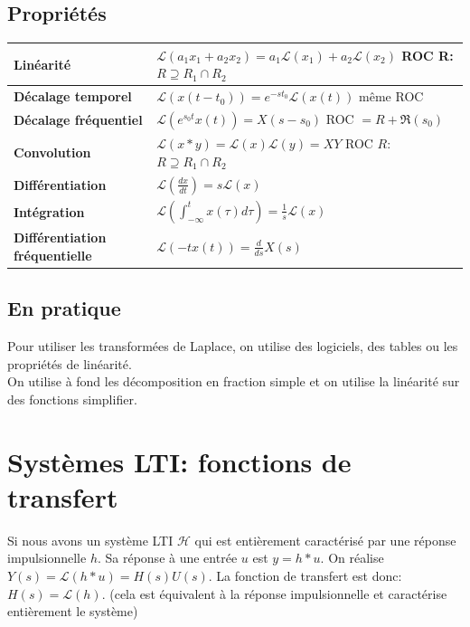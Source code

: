 \documentclass{report}
\begin{document}
\subsection{Propriétés}

\begin{center}
\begin{tabular}{|m{2.5cm}|m{7cm}|}
\hline
\textbf{Linéarité} & $\mathcal{L}(a_1 x_1 + a_2 x_2) = a_1 \mathcal{L}(x_1) + a_2 \mathcal{L}(x_2)$ \newline  ROC R: $R \supseteq R_1 \cap R_2$ \\
\hline
\textbf{Décalage temporel} & $\mathcal{L}(x(t-t_0)) = e^{-s t_0} \mathcal{L}(x(t))$ \newline même ROC\\
\hline
\textbf{Décalage fréquentiel} & $\mathcal{L}(e^{s_0 t}x(t)) = X(s-s_0)$ \newline ROC $= R + \mathfrak{R}(s_0)$\\
\hline
\textbf{Convolution} & $\mathcal{L}(x \ast y) = \mathcal{L}(x) \mathcal{L}(y) = XY$ \newline ROC $R$: $R \supseteq R_1 \cap R_2$\\
\hline
\textbf{Différentiation} & $\mathcal{L} \left( \frac{dx}{dt} \right) = s \mathcal{L}(x)$\\
\hline
\textbf{Intégration} & $\mathcal{L} \left( \int_{-\infty}^t x( \tau ) d \tau \right) = \frac{1}{s} \mathcal{L}(x)$\\
\hline
\textbf{Différentiation fréquentielle} & $\mathcal{L}(-tx(t)) = \frac{d}{ds} X(s)$\\
\hline
\end{tabular}
\end{center}
\subsection{En pratique}
Pour utiliser les transformées de Laplace, on utilise des logiciels, des tables ou les propriétés de linéarité.\\
On utilise à fond les décomposition en fraction simple et on utilise la linéarité sur des fonctions simplifier.

\section{Systèmes LTI: fonctions de transfert}
Si nous avons un système LTI $\mathcal{H}$ qui est entièrement caractérisé par une réponse impulsionnelle $h$. Sa réponse à une entrée $u$ est $y = h \ast u$. On réalise $Y(s) = \mathcal{L}(h \ast u) = H(s) U(s)$. La fonction de transfert est donc: \textbf{$H(s) = \mathcal{L}(h)$}. (cela est équivalent à la réponse impulsionnelle et caractérise entièrement le système)
\end{document}
